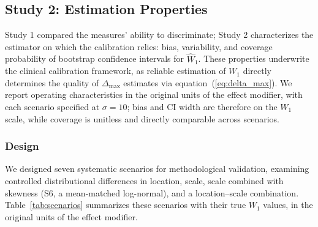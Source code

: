 \documentclass[AMA,Times1COL]{WileyNJDv5}
\begin{document}

\subsection{Study 2: Estimation Properties}\label{sec:study2}

Study 1 compared the measures' ability to discriminate; Study 2 characterizes the estimator on which the calibration relies: bias, variability, and coverage probability of bootstrap confidence intervals for $\widehat{W}_1$. These properties underwrite the clinical calibration framework, as reliable estimation of $W_1$ directly determines the quality of $\Delta_{\max}$ estimates via equation~(\ref{eq:delta_max}). We report operating characteristics in the original units of the effect modifier, with each scenario specified at $\sigma = 10$; bias and CI width are therefore on the $W_1$ scale, while coverage is unitless and directly comparable across scenarios.

\subsubsection{Design}\label{sec:sim_design}

We designed seven systematic scenarios for methodological validation, examining controlled distributional differences in location, scale, scale combined with skewness (S6, a mean-matched log-normal), and a location--scale combination. Table~\ref{tab:scenarios} summarizes these scenarios with their true $W_1$ values, in the original units of the effect modifier.
\end{document}

